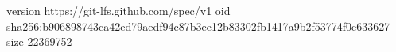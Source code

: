 version https://git-lfs.github.com/spec/v1
oid sha256:b906898743ca42ed79aedf94c87b3ee12b83302fb1417a9b2f53774f0e633627
size 22369752
